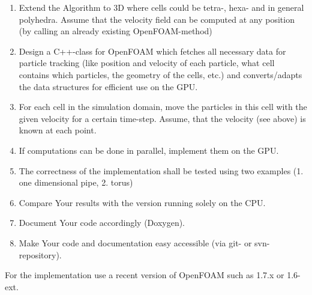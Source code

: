 \begin{enumerate}
    \item Extend the Algorithm to 3D where cells could be tetra-, hexa- and in general polyhedra. Assume that the velocity field can be computed at any position (by calling an already existing OpenFOAM-method)
    \item Design a C++-class for OpenFOAM which fetches all necessary data for particle tracking (like position and velocity of each particle, what cell contains which particles, the geometry of the cells, etc.) and converts/adapts the data structures for efficient use on the GPU.
    \item For each cell in the simulation domain, move the particles in this cell with the given velocity for a certain time-step. Assume, that the velocity (see above) is known at each point.
    \item If computations can be done in parallel, implement them on the GPU.
    \item The correctness of the implementation shall be tested using two examples (1. one dimensional pipe, 2. torus)
    \item Compare Your results with the version running solely on the CPU.
    \item Document Your code accordingly (Doxygen).
    \item Make Your code and documentation easy accessible (via git- or svn-repository).
\end{enumerate}

For the implementation use a recent version of OpenFOAM such as 1.7.x or 1.6-ext.
